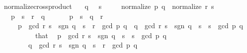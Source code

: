 \begin{isabellebody}
\isanewline
{}\isamarkupfalse%
\ normalize{\isacharunderscore}{\kern0pt}crossproduct{\isacharcolon}{\kern0pt}\isanewline
\ \ \ {\isachardoublequoteopen}q\ {\isasymnoteq}\ {}{\isachardoublequoteclose}\ {\isachardoublequoteopen}s\ {\isasymnoteq}\ {}{\isachardoublequoteclose}\isanewline
\ \ \ {\isachardoublequoteopen}normalize\ {\isacharparenleft}{\kern0pt}p{\isacharcomma}{\kern0pt}\ q{\isacharparenright}{\kern0pt}\ {\isacharequal}{\kern0pt}\ normalize\ {\isacharparenleft}{\kern0pt}r{\isacharcomma}{\kern0pt}\ s{\isacharparenright}{\kern0pt}{\isachardoublequoteclose}\isanewline
\ \ \ {\isachardoublequoteopen}p\ {\isacharasterisk}{\kern0pt}\ s\ {\isacharequal}{\kern0pt}\ r\ {\isacharasterisk}{\kern0pt}\ q{\isachardoublequoteclose}\isanewline
%
\isadelimproof
%
\endisadelimproof
%
\isatagproof
{}\isamarkupfalse%
\ {\isacharminus}{\kern0pt}\isanewline
\ \ \isamarkupfalse%
\ {\isacharasterisk}{\kern0pt}{\isacharcolon}{\kern0pt}\ {\isachardoublequoteopen}p\ {\isacharasterisk}{\kern0pt}\ s\ {\isacharequal}{\kern0pt}\ q\ {\isacharasterisk}{\kern0pt}\ r{\isachardoublequoteclose}\isanewline
\ \ \ \ \ {\isachardoublequoteopen}p\ {\isacharasterisk}{\kern0pt}\ gcd\ r\ s\ {\isacharequal}{\kern0pt}\ sgn\ {\isacharparenleft}{\kern0pt}q\ {\isacharasterisk}{\kern0pt}\ s{\isacharparenright}{\kern0pt}\ {\isacharasterisk}{\kern0pt}\ r\ {\isacharasterisk}{\kern0pt}\ gcd\ p\ q{\isachardoublequoteclose}\ \ {\isachardoublequoteopen}q\ {\isacharasterisk}{\kern0pt}\ gcd\ r\ s\ {\isacharequal}{\kern0pt}\ sgn\ {\isacharparenleft}{\kern0pt}q\ {\isacharasterisk}{\kern0pt}\ s{\isacharparenright}{\kern0pt}\ {\isacharasterisk}{\kern0pt}\ s\ {\isacharasterisk}{\kern0pt}\ gcd\ p\ q{\isachardoublequoteclose}\isanewline
\ \ \isamarkupfalse%
\ {\isacharminus}{\kern0pt}\isanewline
\ \ \ \ \isamarkupfalse%
\ that\ \isamarkupfalse%
\ {\isachardoublequoteopen}{\isacharparenleft}{\kern0pt}p\ {\isacharasterisk}{\kern0pt}\ gcd\ r\ s{\isacharparenright}{\kern0pt}\ {\isacharasterisk}{\kern0pt}\ {\isacharparenleft}{\kern0pt}sgn\ {\isacharparenleft}{\kern0pt}q\ {\isacharasterisk}{\kern0pt}\ s{\isacharparenright}{\kern0pt}\ {\isacharasterisk}{\kern0pt}\ s\ {\isacharasterisk}{\kern0pt}\ gcd\ p\ q{\isacharparenright}{\kern0pt}\ {\isacharequal}{\kern0pt}\isanewline
\ \ \ \ \ \ \ \ {\isacharparenleft}{\kern0pt}q\ {\isacharasterisk}{\kern0pt}\ gcd\ r\ s{\isacharparenright}{\kern0pt}\ {\isacharasterisk}{\kern0pt}\ {\isacharparenleft}{\kern0pt}sgn\ {\isacharparenleft}{\kern0pt}q\ {\isacharasterisk}{\kern0pt}\ s{\isacharparenright}{\kern0pt}\ {\isacharasterisk}{\kern0pt}\ r\ {\isacharasterisk}{\kern0pt}\ gcd\ p\ q{\isacharparenright}{\kern0pt}{\isachardoublequoteclose}\isanewline

\end{isabellebody}

